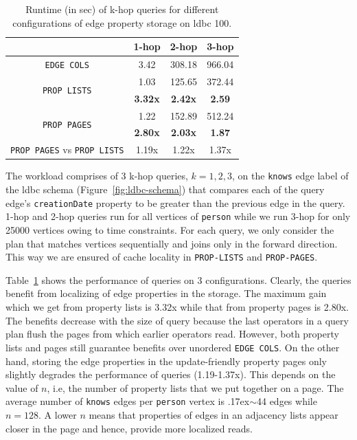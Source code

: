\begin{table}
	\centering
	\bgroup
	\setlength{\tabcolsep}{8pt}
	\def\arraystretch{1.2}%
	\begin{tabular}{ |c|c|c|c| } 
		\hline
		& \textbf{1-hop} & \textbf{2-hop} & \textbf{3-hop} \\
		\hline \hline
		\texttt{EDGE COLS}& 3.42 & 308.18 & 966.04\\ 
		\hline
		\multirow{2}{*}{\texttt{PROP LISTS}}& 1.03 & 125.65 & 372.44 \\ 
		& \textbf{3.32x} & \textbf{2.42x} & \textbf{2.59}\\ 
		\hline 
		\multirow{2}{*}{\texttt{PROP PAGES}} & 1.22 & 152.89 & 512.24 \\ 
		& \textbf{2.80x} & \textbf{2.03x} & \textbf{1.87} \\ 
		\hline \hline
		\texttt{PROP PAGES} vs \texttt{PROP LISTS} & 1.19x & 1.22x & 1.37x \\
		\hline
	\end{tabular}
	\egroup
	\captionsetup{justification=centering}
	\caption{Runtime (in sec) of k-hop queries for different configurations of edge property storage on \gls{ldbc} 100.}
	\label{tbl:mem2}
\end{table}

The workload comprises of 3 k-hop queries, $k=1,2,3$, on the \texttt{knows} edge label of the \gls{ldbc} schema (Figure~\ref{fig:ldbc-schema}) that compares each of the query edge's \texttt{creationDate} property to be greater than the previous edge in the query. 1-hop and 2-hop queries run for all vertices of \texttt{person} while we run 3-hop for only 25000 vertices owing to time constraints. For each query, we only consider the plan that matches vertices sequentially and joins only in the forward direction. This way we are ensured of cache locality in \texttt{PROP-LISTS} and \texttt{PROP-PAGES}.

Table~\ref{tbl:mem2} shows the performance of queries on 3 configurations. Clearly, the queries benefit from localizing of edge properties in the storage. The maximum gain which we get from property lists is 3.32x while that from property pages is 2.80x. The benefits decrease with the size of query because the last operators in a query plan flush the pages from which earlier operators read. However, both property lists and pages still guarantee benefits over unordered \texttt{EDGE COLS}. On the other hand, storing the edge properties in the update-friendly property pages only slightly degrades the performance of queries (1.19-1.37x). This depends on the value of $n$, i.e, the number of property lists that we put together on a page. The average number of \texttt{knows} edges per \texttt{person} vertex is {\raise.17ex\hbox{$\scriptstyle\sim$}}44 edges while $n=128$. A lower $n$ means that properties of edges in an adjacency lists appear closer in the page and hence, provide more localized reads.

